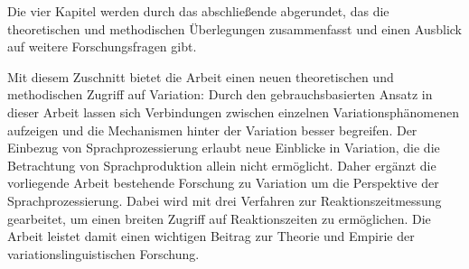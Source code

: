 Die vier Kapitel werden durch das abschließende  abgerundet, das die theoretischen und methodischen Überlegungen zusammenfasst und einen Ausblick auf weitere Forschungsfragen gibt. 


Mit diesem Zuschnitt bietet die Arbeit einen neuen theoretischen und methodischen Zugriff auf Variation:  Durch den  gebrauchsbasierten Ansatz in dieser Arbeit lassen sich Verbindungen zwischen einzelnen Va\-ri\-a\-tions\-phänomenen aufzeigen und die Mechanismen hinter der Variation besser begreifen.  Der Einbezug von Sprachprozessierung erlaubt neue Einblicke in Variation, die die Betrachtung von Sprachproduktion allein nicht ermöglicht. Daher ergänzt die vorliegende Arbeit bestehende Forschung zu Variation um die Perspektive der Sprachprozessierung. Dabei wird mit drei Verfahren zur Reaktionszeitmessung gearbeitet, um einen breiten Zugriff auf Reaktionszeiten zu ermöglichen. Die Arbeit leistet damit einen wichtigen Beitrag zur Theorie und Empirie der variations\-lingu\-ist\-ischen Forschung.


